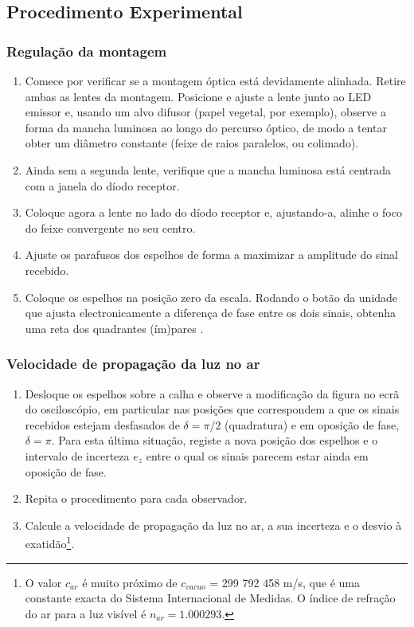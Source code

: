 \documentclass[a4paper,12pt]{article}      %
\begin{document}
\subsection{\sf Procedimento Experimental}
\subsubsection{\sf Regulação da montagem}
 
\begin{enumerate}
\setlength{\itemsep}{0mm}
\item Comece por verificar se a montagem óptica está devidamente alinhada. Retire ambas as lentes da montagem. Posicione e ajuste a lente junto ao LED emissor e, usando um alvo difusor (papel vegetal, por exemplo), observe a forma da mancha luminosa ao longo do percurso óptico, de modo a tentar obter um diâmetro constante (feixe de raios paralelos, ou colimado).
\item Ainda sem a segunda lente, verifique que a mancha luminosa está centrada com  a janela do díodo receptor.
\item Coloque agora a lente no lado do díodo receptor e, ajustando-a, alinhe o foco do feixe convergente no seu centro. 
\item Ajuste os parafusos dos espelhos de forma a maximizar a amplitude do sinal  recebido.
\item Coloque os espelhos na posição zero da escala. Rodando o botão da unidade que ajusta electronicamente a diferença de fase entre os dois sinais, obtenha uma reta dos quadrantes (ím)pares . 
\end{enumerate}

\subsubsection{\sf Velocidade de propagação da luz no ar}
\begin{enumerate}
\item Desloque os espelhos sobre a calha e observe a modificação da figura no ecrã do 
osciloscópio, em particular nas posições que correspondem a que os sinais recebidos estejam 
desfasados de $\delta=\pi/2$ (quadratura) e em oposição de fase, $\delta=\pi$. Para esta última situação, registe a 
nova posição dos espelhos e o intervalo de incerteza $e_z$  entre o qual os sinais parecem estar ainda em 
oposição de fase. 
\item Repita o procedimento para cada observador. 
\item Calcule a velocidade de propagação da luz no ar, a sua incerteza e o desvio à exatidão\footnote{O valor $c_{ar}$ é muito próximo de $c_{vacuo}$ = 299 792 458 m/s, que é uma constante exacta do Sistema Internacional de Medidas. O índice de refração do ar para a luz visível é $n_{ar}=1.000293$.}. 
\end{enumerate}
\end{document}
